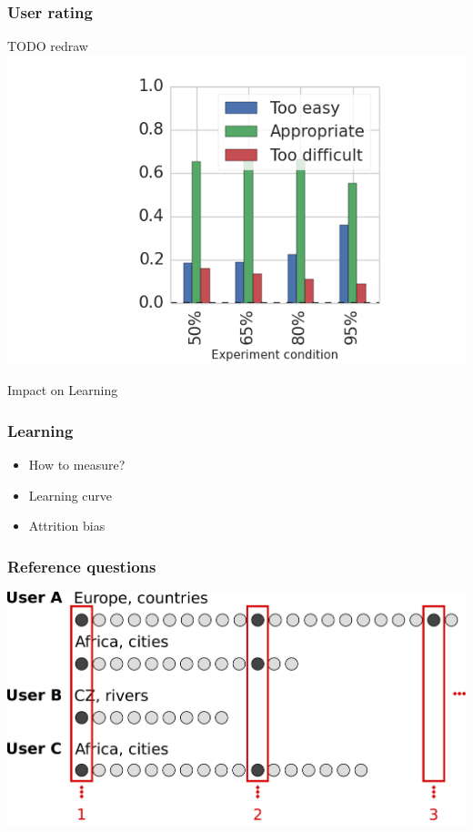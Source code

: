 \documentclass[bigger]{beamer}
\begin{document}
\begin{frame}
  \frametitle{User rating}
  TODO redraw
  \includegraphics[width=\textwidth]{img/rating_by_divider_ab_school_divider_target_difficulty_answers}
\end{frame}

\begin{frame}
	\begin{center}
    {\Huge Impact on Learning} 
	\end{center}
\end{frame}

\begin{frame}
  \frametitle{Learning}
	\begin{itemize}
		\item How to measure?
		\item Learning curve
		\item Attrition bias
	\end{itemize}

\end{frame}

\begin{frame}
  \frametitle{Reference questions}
  \includegraphics[width=\textwidth]{img/reference_answers_learning}
\end{frame}
\end{document}
